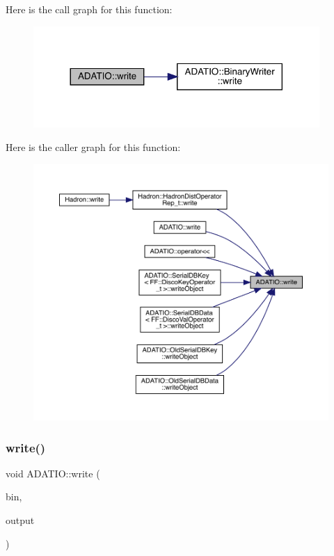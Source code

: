 Here is the call graph for this function\+:\nopagebreak
\begin{figure}[H]
\begin{center}
\leavevmode
\includegraphics[width=308pt]{d0/dba/namespaceADATIO_a12d01adc4b592d85f0f5f5c101205c08_cgraph}
\end{center}
\end{figure}
Here is the caller graph for this function\+:\nopagebreak
\begin{figure}[H]
\begin{center}
\leavevmode
\includegraphics[width=350pt]{d0/dba/namespaceADATIO_a12d01adc4b592d85f0f5f5c101205c08_icgraph}
\end{center}
\end{figure}
\mbox{\label{namespaceADATIO_a7a53460de240b5544de0b7c60b2eb455}} 
\subsubsection{\texorpdfstring{write()}{write()}\hspace{0.1cm}{\footnotesize\ttfamily [2/25]}}
{\footnotesize\ttfamily void A\+D\+A\+T\+I\+O\+::write (\begin{DoxyParamCaption}\item[{\mbox{\hyperlink{classADATIO_1_1BinaryWriter}{Binary\+Writer}} \&}]{bin,  }\item[{const char $\ast$}]{output }\end{DoxyParamCaption})}

